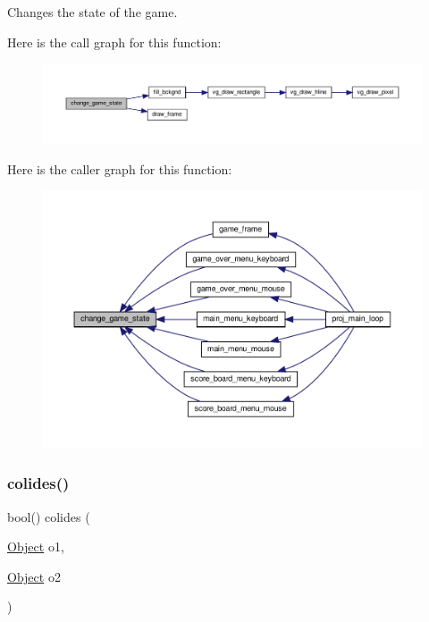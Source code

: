 Changes the state of the game. 

Here is the call graph for this function\+:\nopagebreak
\begin{figure}[H]
\begin{center}
\leavevmode
\includegraphics[width=350pt]{group__utils_gad4300b6e93d7638f0ca14875cf7476cf_cgraph}
\end{center}
\end{figure}
Here is the caller graph for this function\+:\nopagebreak
\begin{figure}[H]
\begin{center}
\leavevmode
\includegraphics[width=350pt]{group__utils_gad4300b6e93d7638f0ca14875cf7476cf_icgraph}
\end{center}
\end{figure}
\mbox{\label{group__utils_gaf433e5aeb6e9df7b15e233a2c4251577}} 
\subsubsection{\texorpdfstring{colides()}{colides()}}
{\footnotesize\ttfamily bool() colides (\begin{DoxyParamCaption}\item[{\hyperlink{structObject}{Object}}]{o1,  }\item[{\hyperlink{structObject}{Object}}]{o2 }\end{DoxyParamCaption})}



